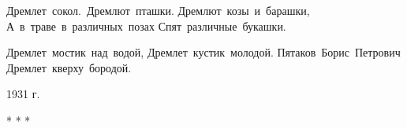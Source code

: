 \vbox{%
  \hfil%
  \vbox{%
    \hbox{Дремлет сокол. Дремлют пташки.}%
    \hbox{Дремлют козы и барашки,}%
    \hbox{А в траве в различных позах}%
    \hbox{Спят различные букашки.}%
  }%
  \hfill%
} 

\vspace{0.3cm}

\vbox{%
  \hspace*{2cm}%
  \vbox{%
    \hbox{Дремлет мостик над водой,}%
    \hbox{Дремлет кустик молодой.}%
    \hbox{Пятаков Борис Петрович}%
    \hbox{Дремлет кверху бородой.}%
  }%
}

\begin{flushright} 1931 г. \end{flushright} 
\begin{center} * * * \end{center} 